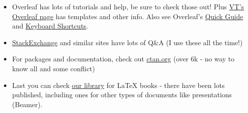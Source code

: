 \documentclass{article}  %
\begin{document}
\begin{itemize}
    \item Overleaf has lots of tutorials and help, be sure to check those out!  Plus \href{https://www.overleaf.com/edu/vtech}{VT's Overleaf page} has templates and other info.  Also see Overleaf's \href{https://www.overleaf.com/latex/templates/a-quick-guide-to-latex/fghqpfgnxggz}{Quick Guide} and \href{https://www.overleaf.com/latex/templates/overleaf-keyboard-shortcuts/qykqfvmxdnjf}{Keyboard Shortcuts}.
    \item \href{https://tex.stackexchange.com}{StackExchange} and similar sites have lots of Q\&A (I use these all the time!)
    \item For packages and documentation, check out \href{https://ctan.org}{ctan.org} (over 6k - no way to know all and some conflict)
    \item Last you can check \href{https://virginiatech.on.worldcat.org/search?queryString=latex\%20documents&databaseList=\&clusterResults=false\&stickyFacetsChecked=true\&baseScope=sz\%3A38864\&groupVariantRecords=false\&scope=sz\%3A38864}{our library} for \LaTeX{} books - there have been lots published, including ones for other types of documents like presentations (Beamer). %
\end{itemize}


\end{document}
